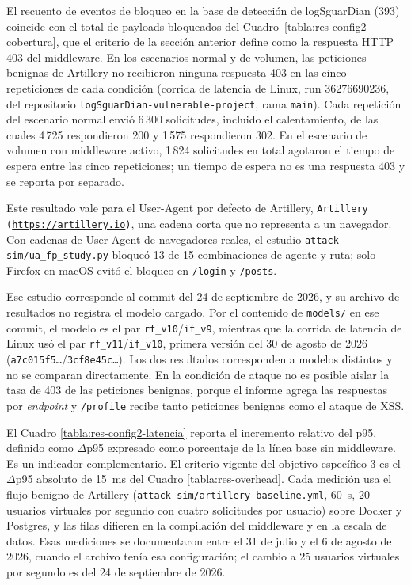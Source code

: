 El recuento de eventos de bloqueo en la base de detección de logSguarDian (393) coincide con el total de payloads bloqueados del Cuadro~\ref{tabla:res-config2-cobertura}, que el criterio de la sección anterior define como la respuesta HTTP 403 del middleware. En los escenarios normal y de volumen, las peticiones benignas de Artillery no recibieron ninguna respuesta 403 en las cinco repeticiones de cada condición (corrida de latencia de Linux, run 36276690236,  del repositorio \texttt{logSguarDian-vulnerable-project}, rama \texttt{main}). Cada repetición del escenario normal envió 6\,300 solicitudes, incluido el calentamiento, de las cuales 4\,725 respondieron 200 y 1\,575 respondieron 302. En el escenario de volumen con middleware activo, 1\,824 solicitudes en total agotaron el tiempo de espera entre las cinco repeticiones; un tiempo de espera no es una respuesta 403 y se reporta por separado.

Este resultado vale para el User-Agent por defecto de Artillery, \texttt{Artillery (\url{https://artillery.io})}, una cadena corta que no representa a un navegador. Con cadenas de User-Agent de navegadores reales, el estudio \texttt{attack-sim/ua\_fp\_study.py} bloqueó 13 de 15 combinaciones de agente y ruta; solo Firefox en macOS evitó el bloqueo en \texttt{/login} y \texttt{/posts}.

Ese estudio corresponde al commit del 24 de septiembre de 2026, y su archivo de resultados no registra el modelo cargado. Por el contenido de \texttt{models/} en ese commit, el modelo es el par \texttt{rf\_v10}/\texttt{if\_v9}, mientras que la corrida de latencia de Linux usó el par \texttt{rf\_v11}/\texttt{if\_v10}, primera versión del 30 de agosto de 2026 (\texttt{a7c015f5\ldots}/\texttt{3cf8e45c\ldots}). Los dos resultados corresponden a modelos distintos y no se comparan directamente. En la condición de ataque no es posible aislar la tasa de 403 de las peticiones benignas, porque el informe agrega las respuestas por \textit{endpoint} y \texttt{/profile} recibe tanto peticiones benignas como el ataque de XSS.

El Cuadro \ref{tabla:res-config2-latencia} reporta el incremento relativo del p95, definido como $\Delta$p95 expresado como porcentaje de la línea base sin middleware. Es un indicador complementario. El criterio vigente del objetivo específico 3 es el $\Delta$p95 absoluto de 15~ms del Cuadro \ref{tabla:res-overhead}. Cada medición usa el flujo benigno de Artillery (\texttt{attack-sim/artillery-baseline.yml}, 60~s, 20 usuarios virtuales por segundo con cuatro solicitudes por usuario) sobre Docker y Postgres, y las filas difieren en la compilación del middleware y en la escala de datos. Esas mediciones se documentaron entre el 31 de julio y el 6 de agosto de 2026, cuando el archivo tenía esa configuración; el cambio a 25 usuarios virtuales por segundo es del 24 de septiembre de 2026.

